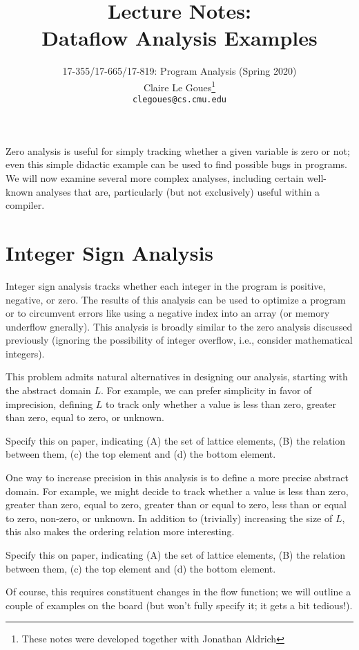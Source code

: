 \documentclass[11pt]{article}
\title{Lecture Notes:\\
Dataflow Analysis Examples}
\author{17-355/17-665/17-819: Program Analysis (Spring 2020)\\
        Claire Le Goues\footnote{These notes were developed together with Jonathan Aldrich}\\
		{\tt clegoues@cs.cmu.edu}}
\date{}
\begin{document}

\maketitle

Zero analysis is useful for simply tracking whether a given variable is zero or
not; even this simple didactic example can be used to find possible bugs in
programs. We will now examine several more complex analyses, including certain
well-known analyses that are, particularly (but not exclusively) useful within a
compiler.

\section{Integer Sign Analysis}

Integer sign analysis tracks whether each integer in the program is positive,
negative, or zero. The results of this analysis can be used to optimize a
program or to circumvent errors like using a negative index into an array (or
memory underflow gnerally). This analysis is broadly similar to the zero
analysis discussed previously (ignoring the possibility of integer overflow,
i.e., consider mathematical integers).

This problem admits natural alternatives in designing our analysis, starting
with the abstract domain $L$. For example, we can prefer simplicity in favor of
imprecision, defining $L$ to track only whether a value is less than zero,
greater than zero, equal to zero, or unknown.  

 Specify this on paper, indicating (A) the set of lattice elements,
(B) the relation between them, (c) the top element and (d) the bottom element. 

\vspace{1em}
One way to increase precision in this analysis is to define a more
precise abstract domain. For example, we might decide to track whether a value
is less than zero, greater than zero, equal to zero, greater than or equal to
zero, less than or equal to zero, non-zero, or unknown. In addition to
(trivially) increasing the size of $L$, this also makes the ordering relation 
more interesting.

 Specify this on paper, indicating (A) the set of lattice elements,
(B) the relation between them, (c) the top element and (d) the bottom element.

Of course, this requires constituent changes in the flow function; we will
outline a couple of examples on the board (but won't fully specify it; it gets a
bit tedious!).
\end{document}
